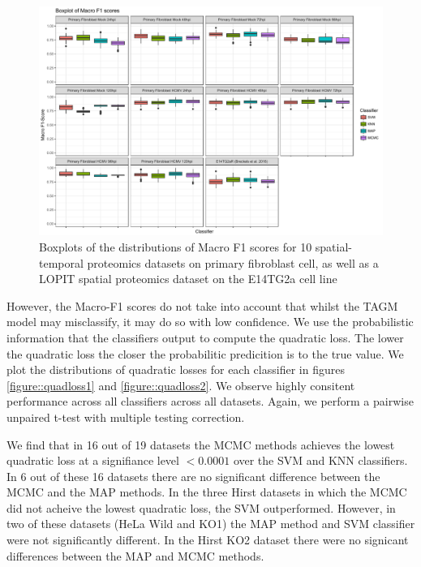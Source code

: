 \documentclass[12pt,english]{article}\usepackage[]{graphicx}\usepackage[]{color}
\begin{document}
\begin{figure}[ht]
  \centering
\includegraphics[width=\textwidth]{F1comparisons2.pdf}
  \caption{Boxplots of the distributions of Macro F1 scores
    for 10 spatial-temporal proteomics datasets on primary fibroblast cell,
    as well as a LOPIT spatial proteomics dataset on the E14TG2a cell line }
  \label{figure::f1scores2}
\end{figure}

\clearpage

However, the Macro-F1 scores do not take into account that whilst the TAGM model may
misclassify, it may do so with low confidence. We use the probabilistic information
that the classifiers output to compute the quadratic loss. The lower the quadratic loss
the closer the probabilitic predicition is to the true value. We plot the distributions of
quadratic losses for each classifier in figures \ref{figure::quadloss1} and \ref{figure::quadloss2}. We observe highly consitent performance across all classifiers across all datasets. Again, we perform a
pairwise unpaired t-test with multiple testing correction.

We find that in 16 out of 19  datasets the MCMC methods achieves the lowest quadratic loss at a signifiance level $<0.0001$ over the SVM and KNN classifiers. In 6 out of these 16 datasets there are no significant
difference between the MCMC and the MAP methods. In the three Hirst datasets in which the MCMC did not acheive
the lowest quadratic loss, the SVM outperformed. However, in two of these datasets (HeLa Wild and KO1) the MAP method and SVM classifier were not significantly different. In the Hirst KO2 dataset there were no signicant differences between the MAP and MCMC methods.
\end{document}
